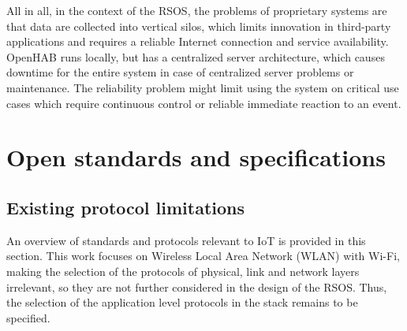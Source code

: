 All in all, in the context of the RSOS, the problems of proprietary systems are that data are collected into vertical silos, which limits innovation in third-party applications and requires a reliable Internet connection and service availability. OpenHAB runs locally, but has a centralized server architecture, which causes downtime for the entire system in case of centralized server problems or maintenance. The reliability problem might limit using the system on critical use cases which require continuous control or reliable immediate reaction to an event.



\section{Open standards and specifications}

\subsection{Existing protocol limitations}

An overview of standards and protocols relevant to IoT is provided in this section. This work focuses on Wireless Local Area Network (WLAN) with Wi-Fi, making the selection of the protocols of physical, link and network layers irrelevant, so they are not further considered in the design of the RSOS. Thus, the selection of the application level protocols in the stack remains to be specified.

